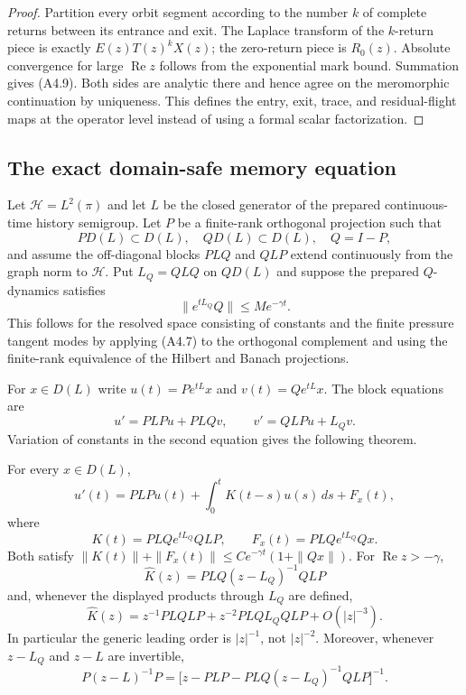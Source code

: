 \begin{proof}
Partition every orbit segment according to the number $k$ of complete returns
between its entrance and exit.  The Laplace transform of the $k$-return piece
is exactly $E(z)T(z)^kX(z)$; the zero-return piece is $R_0(z)$.  Absolute
convergence for large $\operatorname{Re}z$ follows from the exponential mark
bound.  Summation gives (A4.9).  Both sides are analytic there and hence agree
on the meromorphic continuation by uniqueness.  This defines the entry,
exit, trace, and residual-flight maps at the operator level instead of using a
formal scalar factorization.
\end{proof}

\subsection{The exact domain-safe memory equation}

Let $\mathcal H=L^2(\pi)$ and let $L$ be the closed generator of the prepared
continuous-time history semigroup.  Let $P$ be a finite-rank orthogonal
projection such that
\[
 P D(L)\subset D(L),\quad QD(L)\subset D(L),\quad Q=I-P,
\]
and assume the off-diagonal blocks $PLQ$ and $QLP$ extend continuously from
the graph norm to $\mathcal H$.  Put $L_Q=QLQ$ on $QD(L)$ and suppose the
prepared $Q$-dynamics satisfies
\[
 \|e^{tL_Q}Q\|\le Me^{-\gamma t}.                        \tag{A4.10}
\]
This follows for the resolved space consisting of constants and the finite
pressure tangent modes by applying (A4.7) to the orthogonal complement and
using the finite-rank equivalence of the Hilbert and Banach projections.

For $x\in D(L)$ write
$u(t)=Pe^{tL}x$ and $v(t)=Qe^{tL}x$.  The block equations are
\[
 u'=PLPu+PLQv,\qquad v'=QLPu+L_Qv.
\]
Variation of constants in the second equation gives the following theorem.

\begin{theorem}
\label{thm:r23-a4-memory}
For every $x\in D(L)$,
\[
 u'(t)=PLPu(t)+\int_0^tK(t-s)u(s)\,ds+F_x(t),             \tag{A4.11}
\]
where
\[
 K(t)=PLQe^{tL_Q}QLP,
 \qquad F_x(t)=PLQe^{tL_Q}Qx.                            \tag{A4.12}
\]
Both satisfy $\|K(t)\|+\|F_x(t)\|\le
C e^{-\gamma t}(1+\|Qx\|)$.  For
$\operatorname{Re}z>-\gamma$,
\[
 \widehat K(z)=PLQ(z-L_Q)^{-1}QLP                         \tag{A4.13}
\]
and, whenever the displayed products through $L_Q$ are defined,
\[
 \widehat K(z)=z^{-1}PLQLP+z^{-2}PLQL_QQLP+O(|z|^{-3}).  \tag{A4.14}
\]
In particular the generic leading order is $|z|^{-1}$, not $|z|^{-2}$.
Moreover, whenever $z-L_Q$ and $z-L$ are invertible,
\[
 P(z-L)^{-1}P=
 \bigl[z-PLP-PLQ(z-L_Q)^{-1}QLP\bigr]^{-1}.              \tag{A4.15}
\]
\end{theorem}

